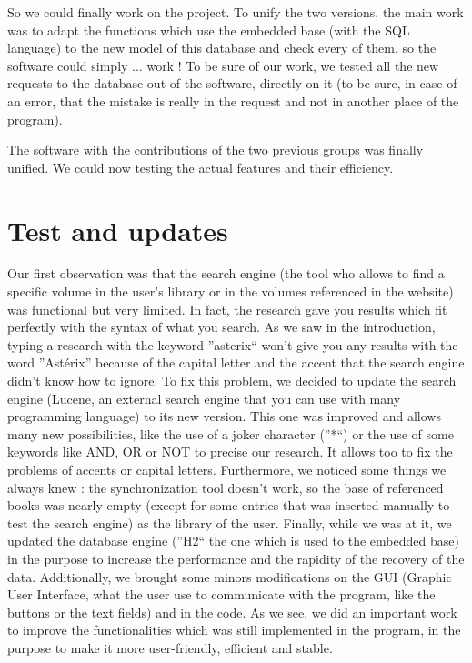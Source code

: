 \documentclass[11pt]{report} %
\begin{document}
So we could finally work on the project. To unify the two versions, the main work was to adapt the functions which use the embedded base (with the SQL language) to the new model of this database and check every of them, so the software could simply ... work ! To be sure of our work, we tested all the new requests to the database out of the software, directly on it (to be sure, in case of an error, that the mistake is really in the request and not in another place of the program).

The software with the contributions of the two previous groups was finally unified. We could now testing the actual features and their efficiency.

\section{Test and updates}
Our first observation was that the search engine (the tool who allows to find a specific volume in the user's library or in the volumes referenced in the website) was functional but very limited. In fact, the research gave you results  which fit perfectly with the syntax of what you search. As we saw in the introduction, typing a research with the keyword ''asterix`` won't give you any results with the word ''Astérix'' because of the capital letter and the accent that the search engine didn't know how to ignore. 
\newline To fix this problem, we decided to update the search engine (Lucene, an external search engine that you can use with many programming language) to its new version. This one was improved and allows many new possibilities, like the use of a joker character (''*``) or the use of some keywords like AND, OR or NOT to precise our research. It allows too to fix the problems of accents or capital letters.
\newline Furthermore, we noticed some things we always knew : the synchronization tool doesn't work, so the base of referenced books was nearly empty (except for some entries that was inserted manually to test the search engine) as the library of the user.
\newline Finally, while we was at it, we updated the database engine (''H2`` the one which is used to the embedded base) in the purpose to increase the performance and the rapidity of the recovery of the data. Additionally, we brought some minors modifications on the GUI (Graphic User Interface, what the user use to communicate with the program, like the buttons or the text fields) and in the code.
\newline As we see, we did an important work to improve the functionalities which was still implemented in the program, in the purpose to make it more user-friendly, efficient and stable.
\end{document}
